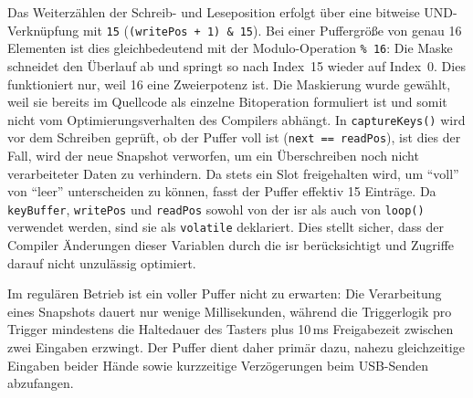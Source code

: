 \documentclass{article}
\begin{document}
Das Weiterzählen der Schreib- und Leseposition erfolgt über eine bitweise UND-Verknüpfung mit \texttt{15} (\texttt{(writePos~+~1)~\&~15}). Bei einer Puffergröße von genau 16 Elementen ist dies gleichbedeutend mit der Modulo-Operation \texttt{\% 16}: Die Maske schneidet den Überlauf ab und springt so nach Index~15 wieder auf Index~0. Dies funktioniert nur, weil 16 eine Zweierpotenz ist. Die Maskierung wurde gewählt, weil sie bereits im Quellcode als einzelne Bitoperation formuliert ist und somit nicht vom Optimierungsverhalten des Compilers abhängt.
In \texttt{captureKeys()} wird vor dem Schreiben geprüft, ob der Puffer voll ist (\texttt{next~==~readPos}), ist dies der Fall, wird der neue Snapshot verworfen, um ein Überschreiben noch nicht verarbeiteter Daten zu verhindern. Da stets ein Slot freigehalten wird, um \enquote{voll} von \enquote{leer} unterscheiden zu können, fasst der Puffer effektiv 15 Einträge. Da \texttt{keyBuffer}, \texttt{writePos} und \texttt{readPos} sowohl von der \gls{isr} als auch von \texttt{loop()} verwendet werden, sind sie als \texttt{volatile} deklariert. Dies stellt sicher, dass der Compiler Änderungen dieser Variablen durch die \gls{isr} berücksichtigt und Zugriffe darauf nicht unzulässig optimiert.

Im regulären Betrieb ist ein voller Puffer nicht zu erwarten: Die Verarbeitung eines Snapshots dauert nur wenige Millisekunden, während die Triggerlogik pro Trigger mindestens die Haltedauer des Tasters plus 10\,ms Freigabezeit zwischen zwei Eingaben erzwingt. Der Puffer dient daher primär dazu, nahezu gleichzeitige Eingaben beider Hände sowie kurzzeitige Verzögerungen beim USB-Senden abzufangen.
\end{document}
